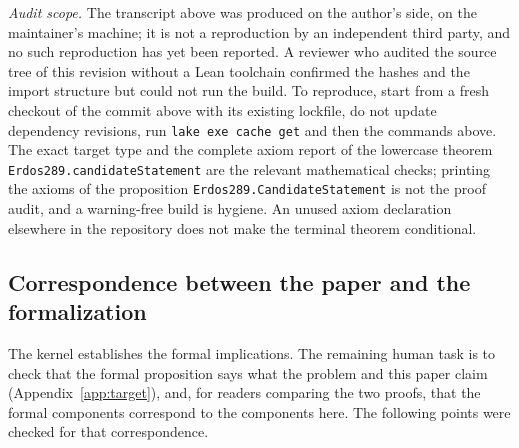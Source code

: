 \documentclass[11pt,letterpaper]{article}
\numberwithin{equation}{section}
\theoremstyle{plain}
\theoremstyle{remark}
\begin{document}
\emph{Audit scope.} The transcript above was produced on the author's side, on the maintainer's machine; it is not a reproduction by an independent third party, and no such reproduction has yet been reported. A reviewer who audited the source tree of this revision without a Lean toolchain confirmed the hashes and the import structure but could not run the build. To reproduce, start from a fresh checkout of the commit above with its existing lockfile, do not update dependency revisions, run \texttt{lake exe cache get} and then the commands above. The exact target type and the complete axiom report of the lowercase theorem \texttt{Erdos289.candidateStatement} are the relevant mathematical checks; printing the axioms of the proposition \texttt{Erdos289.CandidateStatement} is not the proof audit, and a warning-free build is hygiene. An unused axiom declaration elsewhere in the repository does not make the terminal theorem conditional.

\subsection{Correspondence between the paper and the formalization}\label{app:corr}

The kernel establishes the formal implications. The remaining human task is to check that the formal proposition says what the problem and this paper claim (Appendix~\ref{app:target}), and, for readers comparing the two proofs, that the formal components correspond to the components here. The following points were checked for that correspondence.
\end{document}
